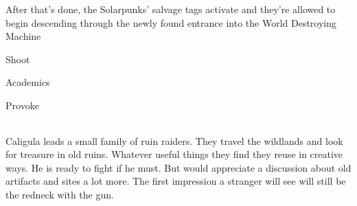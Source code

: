 After that's done, the Solarpunks' salvage tags activate and they're allowed to begin descending through the newly found entrance into the World Destroying Machine

\begin{npcBox}[title=Caligula]

    \begin{aspects}
    \item {}
    \item {}    
    \end{aspects}
    
    \begin{skills}
    \item {} Shoot
    \item {} Academics
    \item {} Provoke
    \end{skills}
    
    \begin{stunts}
    \item {}
    \end{stunts}
    
    \begin{stressSection}
    \end{stressSection}
    \begin{tabularx}{\textwidth}{ XX }
    \end{tabularx}
    
    \begin{consequences}
    \item {}
    \item {}
    \item {}
    \end{consequences}
    
    \begin{npcDescription}
    Caligula leads a small family of ruin raiders. They travel the wildlands and look for treasure in old ruins. Whatever useful things they find they reuse in creative ways.
    He is ready to fight if he must. But would appreciate a discussion about old artifacts and sites a lot more. The first impression a stranger will see will still be the redneck with the gun.
    \end{npcDescription}
    
    \end{npcBox}

